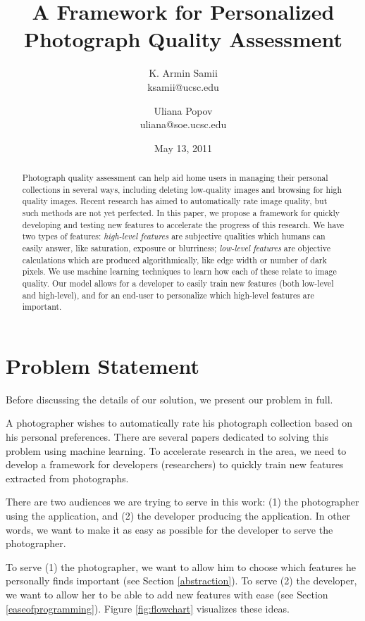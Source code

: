 \documentclass[11pt,letter]{article}
\title{A Framework for Personalized Photograph Quality Assessment}
\author{
K. Armin Samii \\
ksamii@ucsc.edu
\and
Uliana Popov \\
uliana@soe.ucsc.edu}
\date{May 13, 2011}
\begin{document}
\maketitle
\begin{abstract}
Photograph quality assessment can help aid home users in managing their personal collections in several ways, including deleting low-quality images and browsing for high quality images. Recent research has aimed to automatically rate image quality, but such methods are not yet perfected. In this paper, we propose a framework for quickly developing and testing new features to accelerate the progress of this research. We have two types of features: \textit{high-level features} are subjective qualities which humans can easily answer, like saturation, exposure or blurriness; \textit{low-level features} are objective calculations which are produced algorithmically, like edge width or number of dark pixels. We use machine learning techniques to learn how each of these relate to image quality. Our model allows for a developer to easily train new features (both low-level and high-level), and for an end-user to personalize which high-level features are important.

\end{abstract}

\section{Problem Statement}
Before discussing the details of our solution, we present our problem in full.

A photographer wishes to automatically rate his photograph collection based on his personal preferences. There are several papers dedicated to solving this problem using machine learning\cite{springerlink:10.1007/11744078_23}\cite{springerlink:10.1007/978-3-642-10543-2_23}\cite{Yeh:2010:PPR:1873951.1873963}. To accelerate research in the area, we need to develop a framework for developers (researchers) to quickly train new features extracted from photographs.

There are two audiences we are trying to serve in this work: (1) the photographer using the application, and (2) the developer producing the application. In other words, we want to make it as easy as possible for the developer to serve the photographer.

To serve (1) the photographer, we want to allow him to choose which features he personally finds important (see Section \ref{abstraction}). To serve (2) the developer, we want to allow her to be able to add new features with ease (see Section \ref{easeofprogramming}). Figure \ref{fig:flowchart} visualizes these ideas.
\end{document}
